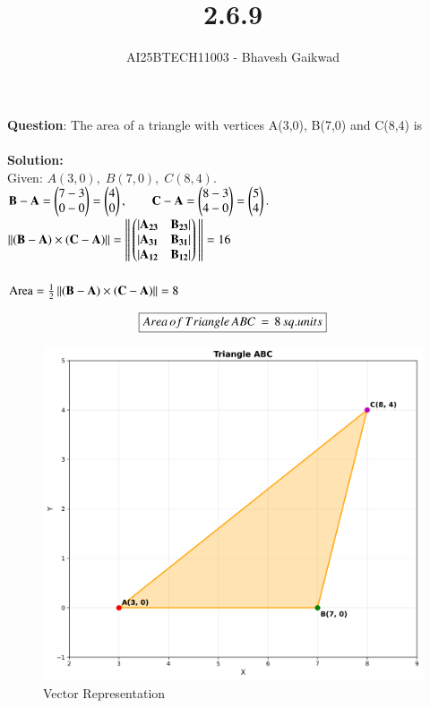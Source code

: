 \documentclass[journal]{IEEEtran}
\begin{document}

\vspace{3cm}

\title{2.6.9}
\author{AI25BTECH11003 - Bhavesh Gaikwad}
{\let\newpage\relax\maketitle}

\renewcommand{\thefigure}{\theenumi}
\renewcommand{\thetable}{\theenumi}
\setlength{\intextsep}{10pt} 


\renewcommand{\thetable}{\theenumi}


\textbf{Question}: The area of a triangle with vertices A(3,0), B(7,0) and C(8,4) is\\\\

\textbf{Solution:}\\
Given: $A(3,0),\; B(7,0),\; C(8,4).$\\

$
\mathbf{B}-\mathbf{A}=\begin{pmatrix}7-3\\0-0\end{pmatrix}
=\begin{pmatrix}4\\0\end{pmatrix},\qquad
\mathbf{C}-\mathbf{A}=\begin{pmatrix}8-3\\4-0\end{pmatrix} = \begin{pmatrix}5\\4\end{pmatrix}.
$\\

$\left\lVert\mathbf{(B-A)} \times \mathbf{(C-A)}\right\rVert = \left\lVert\,\begin{pmatrix}|\mathbf{A_{23}} & \mathbf{B_{23}}| \\ |\mathbf{A_{31}} & \mathbf{B_{31}}| \\ |\mathbf{A_{12}} & \mathbf{B_{12}}|\end{pmatrix}\,\right\rVert = 16 $\\\\


$
\text{Area}=\frac{1}{2}\left\lVert\mathbf{(B-A)} \times \mathbf{(C-A)}\right\rVert = 8
$

\begin{align}
    \centering
    \boxed{Area \, of \, Triangle \, ABC \,= \,8\,sq.units}
\end{align}
\bigskip

\begin{figure}[htbp]
    \centering
    \includegraphics[width=0.65\linewidth]{figs/fig1.png}
    \caption{Vector Representation}
    \label{fig:fig/fig1.png}
\end{figure}
\end{document}
